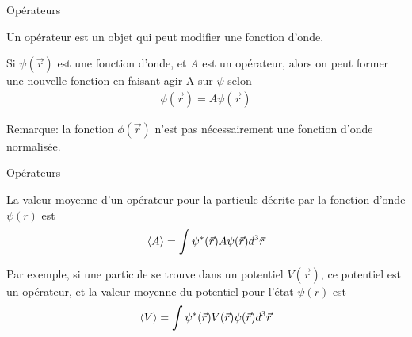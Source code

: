 \documentclass[xcolor=svgnames,t,aspectratio=169,handout]{uqtrcours}
\begin{document}
%
%
%



\begin{frame}{Opérateurs}

Un opérateur est un objet qui peut modifier une fonction d'onde.
%

\medskip

Si $\psi(\vec r)$ est une fonction d'onde, et $A$ est un opérateur,
  alors on peut former une nouvelle fonction en faisant
  agir A sur $\psi$ selon
\begin{align}
  \phi(\vec r) = A \psi(\vec r)
\end{align}

\medskip

Remarque: la fonction $\phi(\vec r)$ n'est pas nécessairement
  une fonction d'onde normalisée.

\end{frame}


\begin{frame}{Opérateurs}


La valeur moyenne d'un opérateur pour la particule décrite par la fonction
  d'onde $\psi(r)$ est
\begin{align}
  \braket{A} = \int \psi^*(\vec r) A \psi(\vec r) d^3 \vec r
\end{align}


Par exemple, si une particule se trouve dans un potentiel $V(\vec r)$,
  ce potentiel est un opérateur, et la valeur moyenne du potentiel
  pour l'état $\psi(r)$ est
\begin{align}
  \braket{V} = \int \psi^*(\vec r) V(\vec r) \psi(\vec r) d^3 \vec r
\end{align}


\end{frame}
\end{document}
